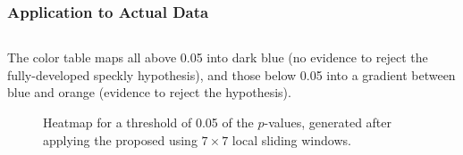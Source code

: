 \documentclass[aspectratio=169,10pt]{beamer}
\begin{document}
\begin{frame} \frametitle{\large{Application to Actual Data }}\vspace{-0.5cm}
 \justifying
\begin{columns}[T,onlytextwidth]
    \begin{column}{.99\textwidth}
			\begin{block}{}\justifying			
			The color table maps all above 0.05  into dark blue (no evidence to reject the fully-developed speckly hypothesis),
			and those below 0.05  into a gradient between blue and orange (evidence to reject the hypothesis).

		\begin{figure}[H]
    \centering
    \caption*{Heatmap for a threshold of 0.05 of the $p$-values, generated after applying the proposed using 
$7\times7$ local sliding windows.}
    \label{fig:real_SAR_Images_coe}
\end{figure}

		\end{block}
    \end{column}

\end{columns}\vspace{0.2cm}
       

\end{frame} 
\end{document}
